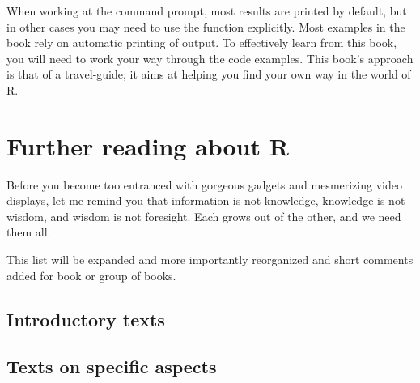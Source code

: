 \documentclass[krantz2,ChapterTOCs]{krantz}\usepackage{knitr}
\begin{document}
When working at the command prompt, most results are printed by default, but in other cases you may need to use the function  explicitly. Most examples in the book rely on automatic printing of output. To effectively learn from this book, you will need to work your way through the code examples. This book's approach is that of a travel-guide, it aims at helping you find your own way in the world of R.




















\chapter{Further reading about R}\label{chap:R:readings}

\begin{VF}
Before you become too entranced with gorgeous gadgets and mesmerizing video displays, let me remind you that information is not knowledge, knowledge is not wisdom, and wisdom is not foresight. Each grows out of the other, and we need them all.

\end{VF}


\begin{warningbox}
  This list will be expanded and more importantly reorganized and short comments added for book or group of books.
\end{warningbox}

\section{Introductory texts}

\cite{Allerhand2011,Dalgaard2008,Zuur2009,Teetor2011,Peng2017,Paradis2005,Peng2016}

\section{Texts on specific aspects}
\end{document}

